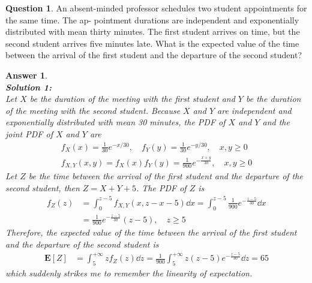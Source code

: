 \documentclass[utf8]{article}
\theoremstyle{definition}%
\newtheorem{question}{Question} %
\theoremstyle{plain}%
\newtheorem{answer}{Answer} %
\begin{document}
\begin{question}
    An absent-minded professor schedules two student appointments for the same time. The ap- pointment durations are independent and exponentially distributed with mean thirty minutes. The first student arrives on time, but the second student arrives five minutes late. What is the expected value of the time between the arrival of the first student and the departure of the second student?
\end{question}
\begin{answer} ~ \\ 
    \textbf{Solution 1:} \\ 
    Let $X$ be the duration of the meeting with the first student and $Y$ be the duration of the meeting with the second student. Because $X$ and $Y$ are independent and exponentially distributed with mean 30 minutes, the PDF of $X$ and $Y$ and the joint PDF of $X$ and $Y$ are
    \begin{equation}
    \begin{aligned}
        f_X(x) = \frac{1}{30}e^{-x/30}, \quad f_Y(y) = \frac{1}{30}e^{-y/30}, \quad x, y \geq 0 \\
        f_{X, Y}(x, y) = f_X(x)f_Y(y) = \frac{1}{900}e^{-\frac{x+y}{30}}, \quad x, y \geq 0
    \end{aligned}
    \end{equation}
    Let $Z$ be the time between the arrival of the first student and the departure of the second student, then $Z = X + Y + 5$. The PDF of $Z$ is
    \begin{equation}
    \begin{aligned}
        f_{Z}(z) &= \int_{0}^{z-5} f_{X, Y}(x, z-x-5) \dd{x} = \int_{0}^{z-5} \frac{1}{900}e^{-\frac{z-5}{30}} \dd{x} \\
        &= \frac{1}{900}e^{-\frac{z-5}{30}}(z-5), \quad z \geq 5
    \end{aligned}
    \end{equation}
    Therefore, the expected value of the time between the arrival of the first student and the departure of the second student is
    \begin{equation}
    \begin{aligned}
        \mathbf{E}[Z] &= \int_{5}^{+\infty} z f_{Z}(z) \dd{z} = \frac{1}{900} \int_{5}^{+\infty} z(z-5) e^{-\frac{z-5}{30}} \dd{z} = 65
    \end{aligned}
    \end{equation}
    which suddenly strikes me to remember the linearity of expectation. \\

\end{answer}
\end{document}
